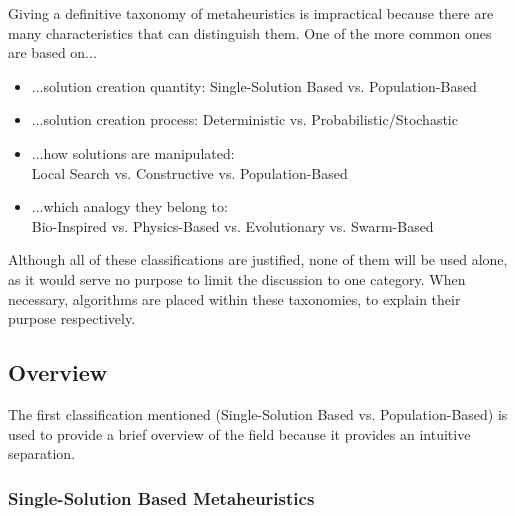 Giving a definitive taxonomy of metaheuristics is impractical because there are many characteristics that can distinguish them. 
One of the more common ones are based on...
\begin{itemize}
	\item ...solution creation quantity: Single-Solution Based vs. Population-Based
	\item ...solution creation process: Deterministic vs. Probabilistic/Stochastic
	\item ...how solutions are manipulated:\\ Local Search vs. Constructive vs. Population-Based \cite{sorensen2013metaheuristics}
	\item ...which analogy they belong to:\\ Bio-Inspired vs. Physics-Based vs. Evolutionary  vs. Swarm-Based
\end{itemize}

Although all of these classifications are justified, none of them will be used alone, as it would serve no purpose to limit the discussion to one category. When necessary, algorithms are placed within these taxonomies, to explain their purpose respectively.

\subsection{Overview}

The first classification mentioned (Single-Solution Based vs. Population-Based) is used to provide a brief overview of the field because it provides an intuitive separation. 

\subsubsection{Single-Solution Based Metaheuristics}

